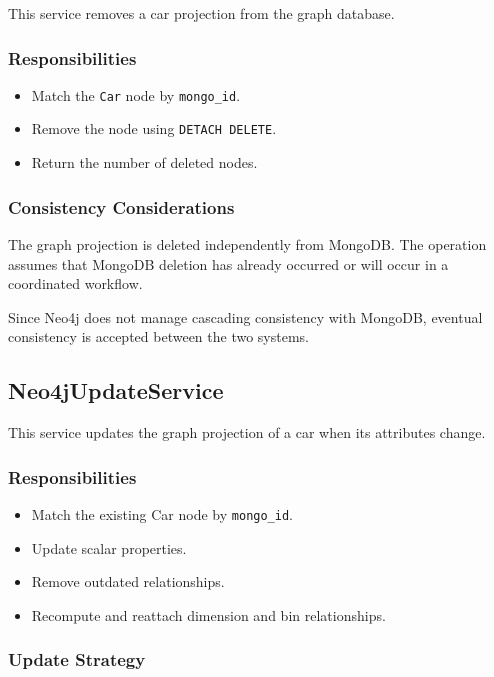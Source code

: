 This service removes a car projection from the graph database.

\subsubsection*{Responsibilities}

\begin{itemize}
    \item Match the \texttt{Car} node by \texttt{mongo\_id}.
    \item Remove the node using \texttt{DETACH DELETE}.
    \item Return the number of deleted nodes.
\end{itemize}

\subsubsection*{Consistency Considerations}

The graph projection is deleted independently from MongoDB.
The operation assumes that MongoDB deletion has already occurred or will occur
in a coordinated workflow.

Since Neo4j does not manage cascading consistency with MongoDB,
eventual consistency is accepted between the two systems.

\subsection{Neo4jUpdateService}

This service updates the graph projection of a car when its attributes change.

\subsubsection*{Responsibilities}

\begin{itemize}
    \item Match the existing Car node by \texttt{mongo\_id}.
    \item Update scalar properties.
    \item Remove outdated relationships.
    \item Recompute and reattach dimension and bin relationships.
\end{itemize}

\subsubsection*{Update Strategy}

